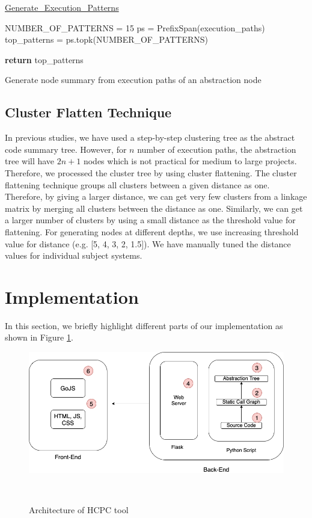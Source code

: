 \begin{algorithm}
    
    \underline{Generate\_Execution\_Patterns} 
    
    NUMBER\_OF\_PATTERNS = 15\;
    ps = PrefixSpan(execution\_paths)\;
    top\_patterns = ps.topk(NUMBER\_OF\_PATTERNS)\; 
    
    \textbf{return} top\_patterns\;
    \caption{Generate node summary from execution paths of an abstraction node}
    \label{alg:execution_patterns}
\end{algorithm}


\subsection{Cluster Flatten Technique}

In previous studies, we have used a step-by-step clustering tree as the abstract code summary tree. However, for $n$ number of execution paths, the abstraction tree will have $2n + 1$ nodes which is not practical for medium to large projects. Therefore, we processed the cluster tree by using cluster flattening. The cluster flattening technique groups all clusters between a given distance as one. Therefore, by giving a larger distance, we can get very few clusters from a linkage matrix by merging all clusters between the distance as one. Similarly, we can get a larger number of clusters by using a small distance as the threshold value for flattening. For generating nodes at different depths, we use increasing threshold value for distance (e.g. [5, 4, 3, 2, 1.5]). We have manually tuned the distance values for individual subject systems.



\section{Implementation }
\label{hla3:implementation}
In this section, we briefly highlight different parts of our implementation as shown in Figure \ref{fig:architecture}.

  \begin{figure}[h]
    \centering
    \includegraphics[width=\columnwidth]{figures/hla3/hla3_implementation.png}
    \caption{Architecture of HCPC tool }~\label{fig:architecture}
    \end{figure}

